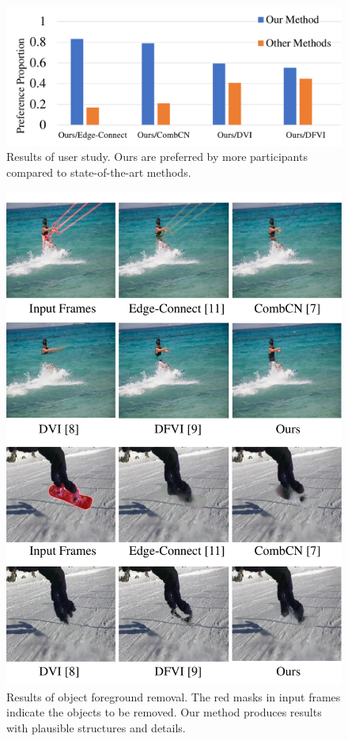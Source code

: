 \begin{figure}[!t]
	\centering
	\includegraphics[width=1.0\columnwidth]{userstudy} %
	\caption{Results of user study. Ours are preferred by more participants compared to state-of-the-art methods.}
	\label{userstudy}
\end{figure}
%

\begin{figure}[t]
	\centering
	\includegraphics[width=0.85\columnwidth]{vis_forg} %
	\caption{Results of object foreground removal. The red masks in input frames indicate the objects to be removed. Our method produces results with plausible structures and details.}
	\label{vis_forg}
\end{figure}


